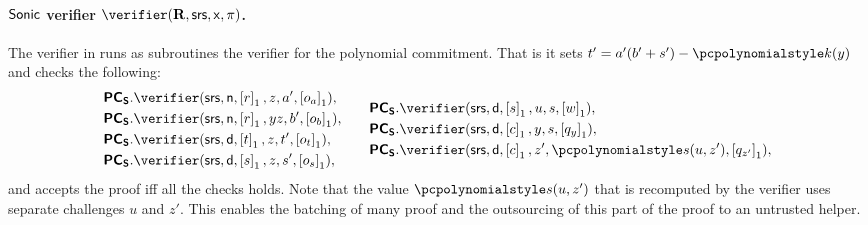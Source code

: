 \documentclass[runningheads,10pt]{llncs}
\begin{document}
\paragraph{${\textnormal{\textsf{Sonic}}}$ verifier $\verifier(\REL, \srs, \inp, \zkproof)$.} The verifier
in \sonic{} runs as subroutines the verifier for the polynomial commitment. That
is it sets $t' = a'(b' + s') - \p{k}(y)$ and checks the following:
\begin{equation*}
  \begin{split}
    &\PCOMs.\verifier(\srs, \multconstr, \gone{r}, z, a', \gone{o_a}), \\
    &\PCOMs.\verifier(\srs, \multconstr, \gone{r}, yz, b', \gone{o_b}),\\
    &\PCOMs.\verifier(\srs, \dconst, \gone{t}, z, t', \gone{o_t}),\\
    &\PCOMs.\verifier(\srs, \dconst, \gone{s}, z, s', \gone{o_s}),\\
  \end{split}
  \qquad
  \begin{split}
    &\PCOMs.\verifier(\srs, \dconst, \gone{s}, u, s, \gone{w}),\\
    &\PCOMs.\verifier(\srs, \dconst, \gone{c}, y, s, \gone{q_y}),\\
    &\PCOMs.\verifier(\srs, \dconst, \gone{c}, z', \p{s}(u, z'), \gone{q_{z'}}),
  \end{split}
\end{equation*}
and accepts the proof iff all the checks holds. Note that the value $\p{s}(u, z')$ that is recomputed by the verifier uses separate challenges $u$ and $z'$. This enables the batching of many proof and the outsourcing of this part of the proof to an untrusted helper. 
\end{document}
